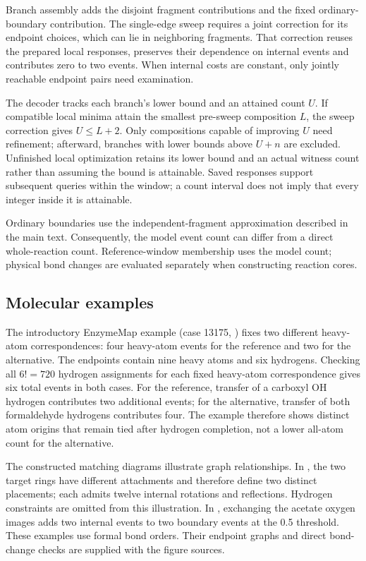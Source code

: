 Branch assembly adds the disjoint fragment contributions and the fixed ordinary-boundary contribution. The single-edge sweep requires a joint correction for its endpoint choices, which can lie in neighboring fragments. That correction reuses the prepared local responses, preserves their dependence on internal events and contributes zero to two events. When internal costs are constant, only jointly reachable endpoint pairs need examination.

The decoder tracks each branch's lower bound and an attained count $U$. If compatible local minima attain the smallest pre-sweep composition $L$, the sweep correction gives $U\leq L+2$. Only compositions capable of improving $U$ need refinement; afterward, branches with lower bounds above $U+n$ are excluded. Unfinished local optimization retains its lower bound and an actual witness count rather than assuming the bound is attainable. Saved responses support subsequent queries within the window; a count interval does not imply that every integer inside it is attainable.

Ordinary boundaries use the independent-fragment approximation described in the main text. Consequently, the model event count can differ from a direct whole-reaction count. Reference-window membership uses the model count; physical bond changes are evaluated separately when constructing reaction cores.

\subsection{Molecular examples}
\label{sec:alternatives-provenance}

The introductory EnzymeMap example (case 13175, ) fixes two different heavy-atom correspondences: four heavy-atom events for the reference and two for the alternative. The endpoints contain nine heavy atoms and six hydrogens. Checking all $6!=720$ hydrogen assignments for each fixed heavy-atom correspondence gives six total events in both cases. For the reference, transfer of a carboxyl OH hydrogen contributes two additional events; for the alternative, transfer of both formaldehyde hydrogens contributes four. The example therefore shows distinct atom origins that remain tied after hydrogen completion, not a lower all-atom count for the alternative.

The constructed matching diagrams illustrate graph relationships. In , the two target rings have different attachments and therefore define two distinct placements; each admits twelve internal rotations and reflections. Hydrogen constraints are omitted from this illustration. In , exchanging the acetate oxygen images adds two internal events to two boundary events at the 0.5 threshold. These examples use formal bond orders. Their endpoint graphs and direct bond-change checks are supplied with the figure sources.

